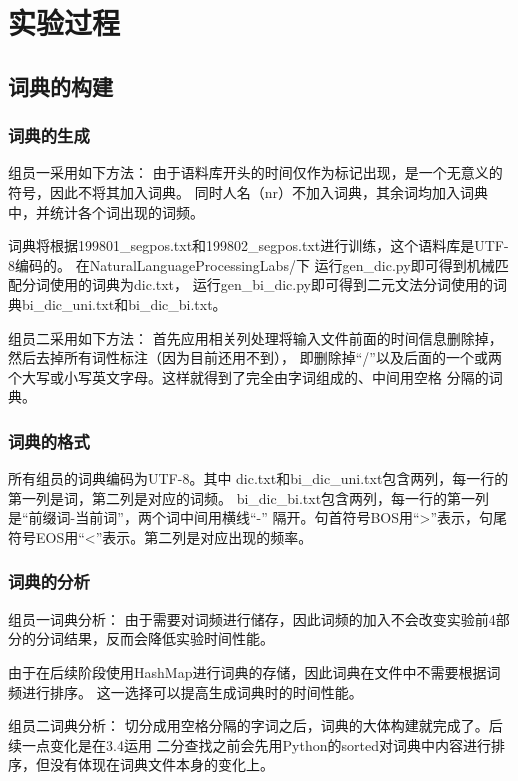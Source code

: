 \section{实验过程}

\subsection{词典的构建}

\subsubsection{词典的生成}

组员一采用如下方法：
由于语料库开头的时间仅作为标记出现，是一个无意义的符号，因此不将其加入词典。
同时人名（nr）不加入词典，其余词均加入词典中，并统计各个词出现的词频。

词典将根据199801\_segpos.txt和199802\_segpos.txt进行训练，这个语料库是UTF-8编码的。
在NaturalLanguageProcessingLabs/下
运行gen\_dic.py即可得到机械匹配分词使用的词典为dic.txt，
运行gen\_bi\_dic.py即可得到二元文法分词使用的词典bi\_dic\_uni.txt和bi\_dic\_bi.txt。

组员二采用如下方法：
首先应用相关列处理将输入文件前面的时间信息删除掉，然后去掉所有词性标注（因为目前还用不到），
即删除掉“/”以及后面的一个或两个大写或小写英文字母。这样就得到了完全由字词组成的、中间用空格
分隔的词典。

\subsubsection{词典的格式}

所有组员的词典编码为UTF-8。其中
dic.txt和bi\_dic\_uni.txt包含两列，每一行的第一列是词，第二列是对应的词频。
bi\_dic\_bi.txt包含两列，每一行的第一列是“前缀词-当前词”，两个词中间用横线“-”
隔开。句首符号BOS用“>”表示，句尾符号EOS用“<”表示。第二列是对应出现的频率。

\subsubsection{词典的分析}

组员一词典分析：
由于需要对词频进行储存，因此词频的加入不会改变实验前4部分的分词结果，反而会降低实验时间性能。

由于在后续阶段使用HashMap进行词典的存储，因此词典在文件中不需要根据词频进行排序。
这一选择可以提高生成词典时的时间性能。

组员二词典分析：
切分成用空格分隔的字词之后，词典的大体构建就完成了。后续一点变化是在3.4运用
二分查找之前会先用Python的sorted对词典中内容进行排序，但没有体现在词典文件本身的变化上。

